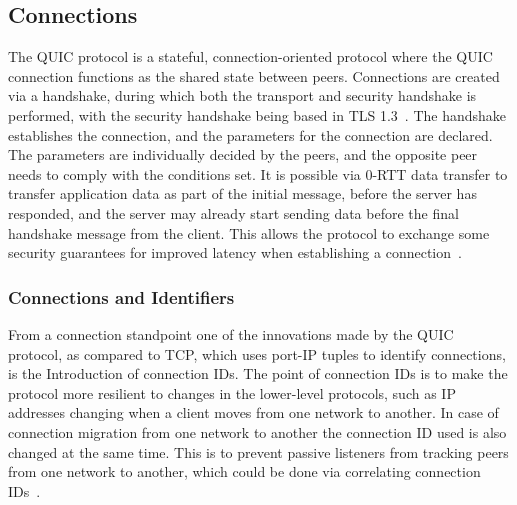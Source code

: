 \documentclass[english, 12pt, a4paper, elec, utf8, a-2b, online]{aaltothesis}
\begin{document}
\subsection{Connections}

The QUIC protocol is a stateful, connection-oriented protocol where the QUIC
connection functions as the shared state between peers. Connections are created
via a handshake, during which both the transport and security handshake is performed,
with the security handshake being based in TLS 1.3~\cite{rfc9001}. The handshake establishes
the connection, and the parameters for the connection are declared. The parameters
are individually decided by the peers, and the opposite peer needs to comply with
the conditions set. It is possible via 0-RTT data transfer to transfer application
data as part of the initial message, before the server has responded, and the server
may already start sending data before the final handshake message from the client.
This allows the protocol to exchange some security guarantees for improved latency
when establishing a connection~\cite{rfc9000}.

\subsubsection{Connections and Identifiers}
\label{sec:connections_ids}

From a connection standpoint one of the innovations made by the QUIC protocol, as
compared to TCP, which uses port-IP tuples to identify connections, is the Introduction
of connection IDs. The point of connection IDs is to make the protocol more resilient
to changes in the lower-level protocols, such as IP addresses changing when a client
moves from one network to another. In case of connection migration from one network to
another the connection ID used is also changed at the same time. This is to prevent
passive listeners from tracking peers from one network to another, which could be
done via correlating connection IDs~\cite{rfc9000}.
\end{document}

